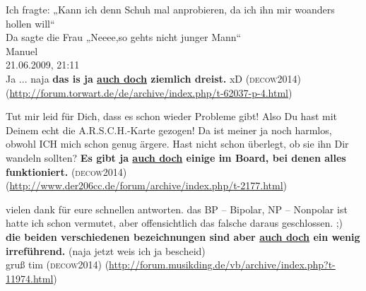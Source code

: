 \begin{exe}
	\ex\label{1185} 
	Ich fragte: „Kann ich denn Schuh mal anprobieren, da ich ihn mir woanders hollen will“\medskip\\
	Da sagte die Frau „Neeee,so gehts nicht junger Mann“\medskip\\
	Manuel\\
	21.06.2009, 21:11\\
	Ja ... naja \textbf{das is ja \ul{auch doch} ziemlich dreist.} xD			
	\hfill\hbox{\scshape(decow2014)}	
	\newline
	{\scriptsize(\url{http://forum.torwart.de/de/archive/index.php/t-62037-p-4.html})}
\end{exe}

\begin{exe}
	\ex\label{1186} 

	Tut mir leid für Dich, dass es schon wieder Probleme gibt! Also Du hast mit Deinem echt die A.R.S.C.H.-Karte gezogen! Da ist meiner ja noch harmlos, 		obwohl ICH mich schon genug ärgere. Hast nicht schon überlegt, ob sie ihn Dir wandeln sollten? \textbf{Es gibt ja \ul{auch doch} einige im 			Board, bei denen alles funktioniert.}
	\hfill\hbox{\scshape(decow2014)}	
	\newline
	{\scriptsize(\url{http://www.der206cc.de/forum/archive/index.php/t-2177.html})}
\end{exe}

\begin{exe}
	\ex\label{1187} 

	vielen dank für eure schnellen antworten. das BP – Bipolar, NP – Nonpolar ist hatte ich schon vermutet, aber offensichtlich das falsche daraus 				geschlossen. ;)\\
	\textbf{die beiden verschiedenen bezeichnungen sind aber \ul{auch doch} ein wenig irreführend.} (naja jetzt weis ich ja bescheid)\\
	gruß tim 		
	\hfill\hbox{\scshape(decow2014)}	
	\newline
	{\scriptsize(\url{http://forum.musikding.de/vb/archive/index.php?t-11974.html})}
\end{exe}

